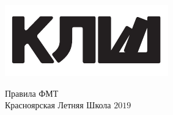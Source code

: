 \documentclass[12pt,a4paper]{article}
\begin{document}
\begin{flushleft}
\parbox[t][0pt]{0.2\textwidth}
{
{%
\vspace{0\baselineskip}
\includegraphics[scale=1.5]{klsh_logo_mod.pdf}\par
}
}
\end{flushleft}
\hfill
\parbox[t][0pt]{0.80\textwidth}
{
{\centering
\vspace{-1.5\baselineskip}
\begin{center}
{\Huge Правила ФМТ}\\
{Красноярская Летняя Школа $2019$}\par
\end{center}
}
}
\vspace{2.1\baselineskip}
\end{document}
